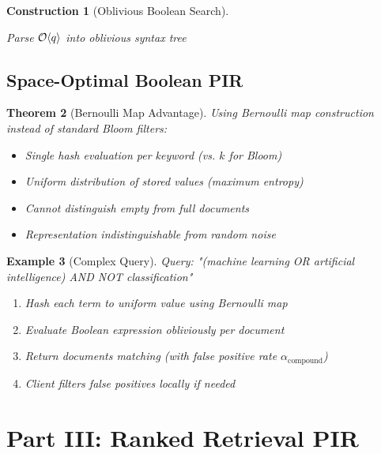 \documentclass[11pt,final]{article}
\newtheorem{theorem}{Theorem}[section]
\newtheorem{example}[theorem]{Example}
\newtheorem{construction}[theorem]{Construction}
\begin{document}
\begin{construction}[Oblivious Boolean Search]
\begin{algorithm}[H]
\caption{Private Boolean Query Evaluation}
Parse $\mathcal{O}\langle q \rangle$ into oblivious syntax tree\;
\end{algorithm}
\end{construction}

\subsection{Space-Optimal Boolean PIR}

\begin{theorem}[Bernoulli Map Advantage]
Using Bernoulli map construction instead of standard Bloom filters:
\begin{itemize}
    \item Single hash evaluation per keyword (vs. $k$ for Bloom)
    \item Uniform distribution of stored values (maximum entropy)
    \item Cannot distinguish empty from full documents
    \item Representation indistinguishable from random noise
\end{itemize}
\end{theorem}

\begin{example}[Complex Query]
Query: "(machine learning OR artificial intelligence) AND NOT classification"
\begin{enumerate}
    \item Hash each term to uniform value using Bernoulli map
    \item Evaluate Boolean expression obliviously per document
    \item Return documents matching (with false positive rate $\alpha_{\text{compound}}$)
    \item Client filters false positives locally if needed
\end{enumerate}
\end{example}

\section{Part III: Ranked Retrieval PIR}
\end{document}
